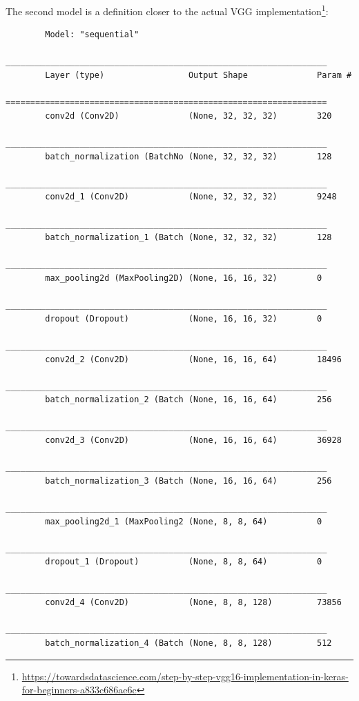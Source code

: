 The second model is a definition closer to the actual VGG implementation\footnote{\href{https://towardsdatascience.com/step-by-step-vgg16-implementation-in-keras-for-beginners-a833c686ae6c}{https://towardsdatascience.com/step-by-step-vgg16-implementation-in-keras-for-beginners-a833c686ae6c}}:
\begin{center}
    \begin{verbatim}
        Model: "sequential"
        _________________________________________________________________
        Layer (type)                 Output Shape              Param #   
        =================================================================
        conv2d (Conv2D)              (None, 32, 32, 32)        320       
        _________________________________________________________________
        batch_normalization (BatchNo (None, 32, 32, 32)        128       
        _________________________________________________________________
        conv2d_1 (Conv2D)            (None, 32, 32, 32)        9248      
        _________________________________________________________________
        batch_normalization_1 (Batch (None, 32, 32, 32)        128       
        _________________________________________________________________
        max_pooling2d (MaxPooling2D) (None, 16, 16, 32)        0         
        _________________________________________________________________
        dropout (Dropout)            (None, 16, 16, 32)        0         
        _________________________________________________________________
        conv2d_2 (Conv2D)            (None, 16, 16, 64)        18496     
        _________________________________________________________________
        batch_normalization_2 (Batch (None, 16, 16, 64)        256       
        _________________________________________________________________
        conv2d_3 (Conv2D)            (None, 16, 16, 64)        36928     
        _________________________________________________________________
        batch_normalization_3 (Batch (None, 16, 16, 64)        256       
        _________________________________________________________________
        max_pooling2d_1 (MaxPooling2 (None, 8, 8, 64)          0         
        _________________________________________________________________
        dropout_1 (Dropout)          (None, 8, 8, 64)          0         
        _________________________________________________________________
        conv2d_4 (Conv2D)            (None, 8, 8, 128)         73856     
        _________________________________________________________________
        batch_normalization_4 (Batch (None, 8, 8, 128)         512       

\end{verbatim}
\end{center}
